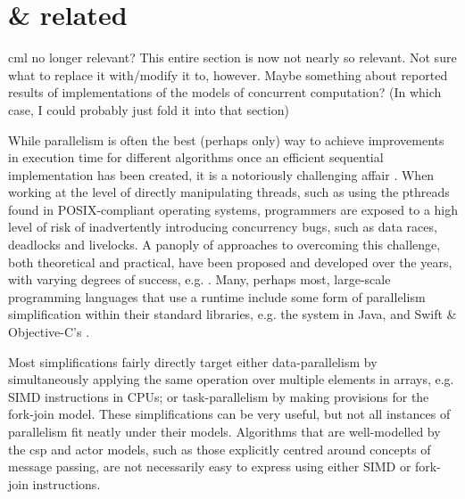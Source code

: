 \section{\label{sec:lr:cml} \& related}

\begin{anfxerror}{\gls{cml} no longer relevant?}
    This entire section is now not nearly so relevant.  Not sure what to replace it with/modify it to, however.  Maybe something about reported results of implementations of the models of concurrent computation?  (In which case, I could probably just fold it into that section)
\end{anfxerror}

While parallelism is often the best (perhaps only) way to achieve improvements in execution time for different algorithms once an efficient sequential implementation has been created, it is a notoriously challenging affair \cite{Shun2017}.  When working at the level of directly manipulating threads, such as using the pthreads found in POSIX-compliant operating systems, programmers are exposed to a high level of risk of inadvertently introducing concurrency bugs, such as data races, deadlocks and livelocks.  A panoply of approaches to overcoming this challenge, both theoretical and practical, have been proposed and developed over the years, with varying degrees of success, e.g. \cite{Boyapati2002,Bocq2012,Seinstra2004}.  Many, perhaps most, large-scale programming languages that use a runtime include some form of parallelism simplification within their standard libraries, e.g. the  system in Java, and Swift \& Objective-C's .

Most simplifications fairly directly target either data-parallelism by simultaneously applying the same operation over multiple elements in arrays, e.g. SIMD instructions in CPUs; or task-parallelism by making provisions for the fork-join model.  These simplifications can be very useful, but not all instances of parallelism fit neatly under their models.  Algorithms that are well-modelled by the \Gls{csp} \cite{Hoare1985} and \Gls{actor} \cite{Agha1997} models, such as those explicitly centred around concepts of message passing, are not necessarily easy to express using either SIMD or fork-join instructions.

